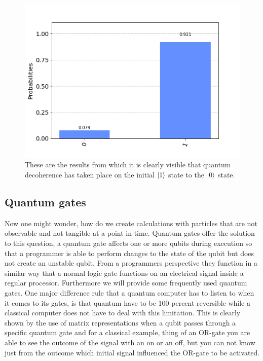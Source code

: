\begin{figure}[h]
	\centering
	\includegraphics[scale = 0.75]{../Demonstration/img/Quantum_decoherence_graph.PNG}
	\caption{These are the results from which it is clearly visible that quantum decoherence has taken place on the initial $\ket{1}$ state to the $\ket{0}$ state.}
\end{figure}



\subsection{Quantum gates}

Now one might wonder, how do we create calculations with particles that are not observable and not tangible at a point in time. Quantum gates offer the solution to this question, a quantum gate affects one or more qubits during execution so that a programmer is able to perform changes to the state of the qubit but does not create an unstable qubit. From a programmers perspective they function in a similar way that a normal logic gate functions on an electrical signal inside a regular processor. Furthermore we will provide some frequently used quantum gates. One major difference rule that a quantum computer has to listen to when it comes to its gates, is that quantum have to be 100 percent reversible while a classical computer does not have to deal with this limitation. This is clearly shown by the use of matrix representations when a qubit passes through a specific quantum gate and for a classical example, thing of an OR-gate you are able to see the outcome of the signal with an on or an off, but you can not know just from the outcome which initial signal influenced the OR-gate to be activated.

